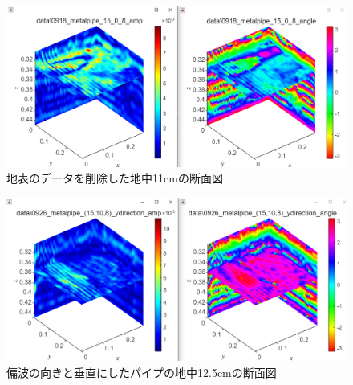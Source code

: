 \documentclass[a4paper,12pt]{jsreport}
\begin{document}
      \begin{figure}[h]
        \begin{center}
         \includegraphics[width=14cm]{dataimage/matlab/0918_metalpipe_(15,0,8)_xdirection_d=34cm_delete_unnecessary.png}
        \caption{地表のデータを削除した地中11cmの断面図}\label{地表のデータを削除した地中11cmの断面図}
        \end{center}
        \end{figure}

        \begin{figure}[h]
          \begin{center}
           \includegraphics[width=14cm]{dataimage/matlab/0918_metalpipe_(15,10,8)_ydirection_d=35cm_delete_unnecessary.png}
          \caption{偏波の向きと垂直にしたパイプの地中12.5cmの断面図}\label{偏波の向きと垂直にしたパイプの地中12.5cmの断面図}
          \end{center}
          \end{figure}

\end{document}
